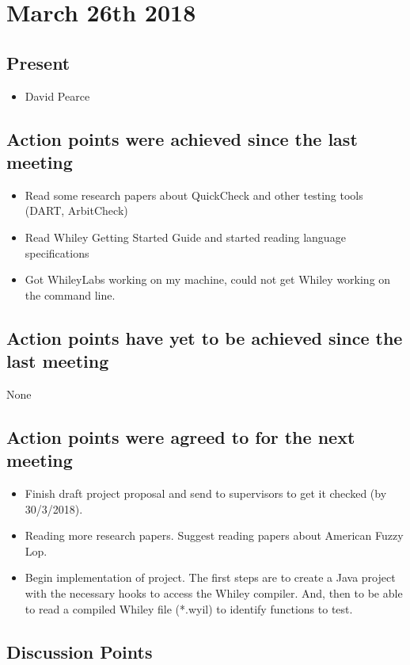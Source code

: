 \documentclass[]{article}
\begin{document}
\section{March 26th 2018}
\subsection{Present}
\begin{itemize}
	\item David Pearce
\end{itemize}

\subsection{Action points were achieved since the last meeting}

\begin{itemize}
	\item Read some research papers about QuickCheck and other testing tools (DART, ArbitCheck)
	\item Read Whiley Getting Started Guide and started reading language specifications
	\item Got WhileyLabs working on my machine, could not get Whiley working on the command line.
\end{itemize}
\subsection{Action points have yet to be achieved since the last meeting}
None
\subsection{Action points were agreed to for the next meeting}
\begin{itemize}
	\item Finish draft project proposal and send to supervisors to get it checked (by 30/3/2018).
	\item Reading more research papers. Suggest reading papers about American Fuzzy Lop.
	\item Begin implementation of project. The first steps are to create a Java project with the necessary hooks to access the Whiley compiler.  And, then to be able to read a compiled Whiley file (*.wyil) to identify functions to test. 
\end{itemize}

\subsection{Discussion Points}
\end{document}
